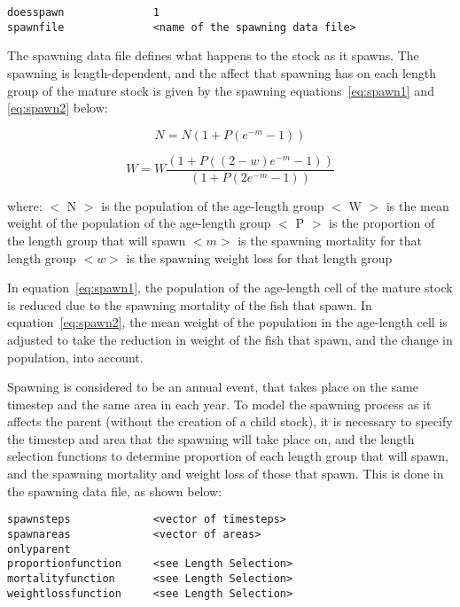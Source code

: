 \documentclass[10pt,twoside]{book}
\begin{document}
{\small\begin{verbatim}
doesspawn              1
spawnfile              <name of the spawning data file>
\end{verbatim}}

The spawning data file defines what happens to the stock as it spawns.  The spawning is length-dependent, and the affect that spawning has on each length group of the mature stock is given by the spawning equations~\ref{eq:spawn1} and \ref{eq:spawn2} below:

\newpage %
\begin{equation}\label{eq:spawn1}
N = N {\left(1 + P {(e^{-m} - 1)}\right)}
\end{equation}

\begin{equation}\label{eq:spawn2}
W = W \frac{\left(1 + P {((2 - w)e^{-m} - 1)}\right)}{\left(1 + P {(2e^{-m} - 1)}\right)}
\end{equation}

where:\newline
$<$ N $>$ is the population of the age-length group\newline
$<$ W $>$ is the mean weight of the population of the age-length group\newline
$<$ P $>$ is the proportion of the length group that will spawn\newline
$<m>$ is the spawning mortality for that length group\newline
$<w>$ is the spawning weight loss for that length group

\bigskip
In equation~\ref{eq:spawn1}, the population of the age-length cell of the mature stock is reduced due to the spawning mortality of the fish that spawn.  In equation~\ref{eq:spawn2}, the mean weight of the population in the age-length cell is adjusted to take the reduction in weight of the fish that spawn, and the change in population, into account.

\bigskip
Spawning is considered to be an annual event, that takes place on the same timestep and the same area in each year.  To model the spawning process as it affects the parent (without the creation of a child stock), it is necessary to specify the timestep and area that the spawning will take place on, and the length selection functions to determine proportion of each length group that will spawn, and the spawning mortality and weight loss of those that spawn.  This is done in the spawning data file, as shown below:

{\small\begin{verbatim}
spawnsteps             <vector of timesteps>
spawnareas             <vector of areas>
onlyparent
proportionfunction     <see Length Selection>
mortalityfunction      <see Length Selection>
weightlossfunction     <see Length Selection>
\end{verbatim}}
\end{document}

